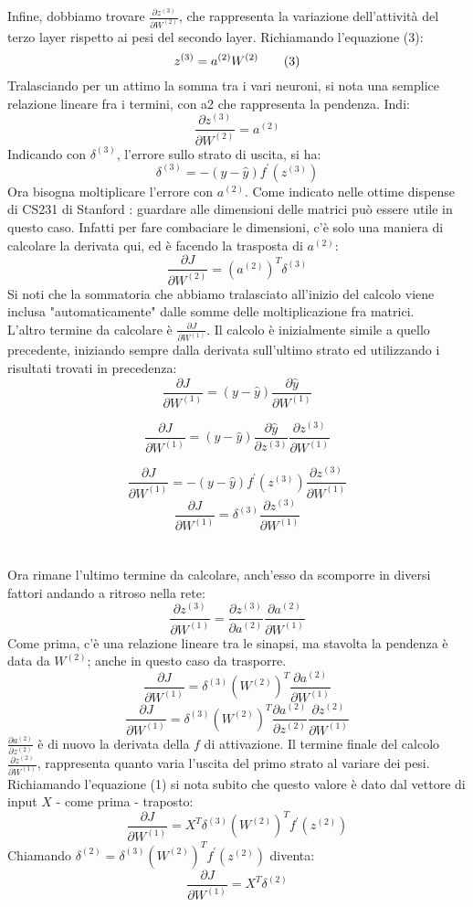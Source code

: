 Infine, dobbiamo trovare $\frac{\partial z^{(3)}}{\partial W^{(2)}}$, che rappresenta la variazione dell'attività del terzo layer rispetto ai pesi del secondo layer. Richiamando l'equazione (3):
$$
z^{(3)} = a^{(2)}W^{(2)} \tag{3}\\
$$
Tralasciando per un attimo la somma tra i vari neuroni, si nota una semplice relazione lineare fra i termini, con a2 che rappresenta la pendenza. Indi:
$$
\frac{\partial z^{(3)}}{\partial W^{(2)}} = a^{(2)}
$$
Indicando con $\delta^{(3)}$, l'errore sullo strato di uscita, si ha:
$$
\delta^{(3)} = -(y-\hat{y}) f^\prime(z^{(3)})
$$
Ora bisogna moltiplicare l'errore con $a^{(2)}$. Come indicato nelle ottime dispense di CS231 di Stanford \parencite{WCS231vec}: guardare alle dimensioni delle matrici può essere utile in questo caso. Infatti per fare combaciare le dimensioni, c'è solo una maniera di calcolare la derivata qui, ed è facendo la trasposta di $a^{(2)}$:
$$
\frac{\partial J}{\partial W^{(2)}} =
(a^{(2)})^T\delta^{(3)}\tag{6}
$$
Si noti che la sommatoria che abbiamo tralasciato all'inizio del calcolo viene inclusa "automaticamente" dalle somme delle moltiplicazione fra matrici.
\\

L'altro termine da calcolare è $\frac{\partial J}{\partial W^{(1)}}$.
Il calcolo è inizialmente simile a quello precedente, iniziando sempre dalla derivata sull'ultimo strato ed utilizzando i risultati trovati in precedenza:
$$
\frac{\partial J}{\partial W^{(1)}} = (y-\hat{y})
\frac{\partial \hat{y}}{\partial W^{(1)}}
$$

$$
\frac{\partial J}{\partial W^{(1)}} = (y-\hat{y})
\frac{\partial \hat{y}}{\partial z^{(3)}}
\frac{\partial z^{(3)}}{\partial W^{(1)}}
$$

$$
\frac{\partial J}{\partial W^{(1)}} = -(y-\hat{y}) f^\prime(z^{(3)}) \frac{\partial z^{(3)}}{\partial W^{(1)}}
$$
$$
\frac{\partial J}{\partial W^{(1)}} = \delta^{(3)} \frac{\partial z^{(3)}}{\partial W^{(1)}}
$$
\\
\\
Ora rimane l'ultimo termine da calcolare, anch'esso da scomporre in diversi fattori andando a ritroso nella rete:
$$
\frac{\partial z^{(3)}}{\partial W^{(1)}} = \frac{\partial z^{(3)}}{\partial a^{(2)}}\frac{\partial a^{(2)}}{\partial W^{(1)}}
$$
Come prima, c'è una relazione lineare tra le sinapsi, ma stavolta la pendenza è data da $W^{(2)}$; anche in questo caso da trasporre.
$$
\frac{\partial J}{\partial W^{(1)}} = \delta^{(3)}
(W^{(2)})^{T}
\frac{\partial a^{(2)}}{\partial W^{(1)}}
$$
$$
\frac{\partial J}{\partial W^{(1)}} = \delta^{(3)}
(W^{(2)})^{T}
\frac{\partial a^{(2)}}{\partial z^{(2)}}
\frac{\partial z^{(2)}}{\partial W^{(1)}}
$$
$\frac{\partial a^{(2)}}{\partial z^{(2)}}$ è di nuovo la derivata della $f$ di attivazione. Il termine finale del calcolo $\frac{\partial z^{(2)}}{\partial W^{(1)}}$, rappresenta quanto varia l'uscita del primo strato al variare dei pesi. Richiamando l'equazione (1) si nota subito che questo valore è dato dal vettore di input $X$ - come prima - traposto:
$$
\frac{\partial J}{\partial W^{(1)}} =
X^{T}
\delta^{(3)}
(W^{(2)})^{T}
f^\prime(z^{(2)})
$$
Chiamando $\delta^{(2)} = \delta^{(3)} (W^{(2)})^{T} f^\prime(z^{(2)})$ diventa:
$$
\frac{\partial J}{\partial W^{(1)}} =
X^{T}\delta^{(2)} \tag{7}
$$

